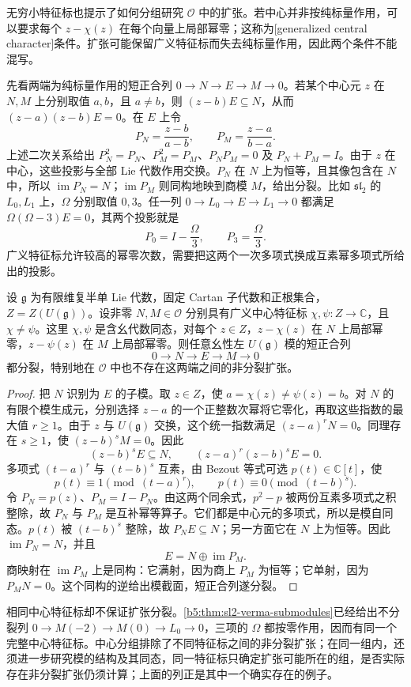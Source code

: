 无穷小特征标也提示了如何分组研究 \(\mathcal O\) 中的扩张。若中心并非按纯标量作用，可以要求每个 \(z-\chi(z)\) 在每个向量上局部幂零；这称为[generalized central character]条件。扩张可能保留广义特征标而失去纯标量作用，因此两个条件不能混写。

\ProseParagraphBreak

先看两端为纯标量作用的短正合列 \(0\to N\to E\to M\to0\)。若某个中心元 \(z\) 在 \(N,M\) 上分别取值 \(a,b\)，且 \(a\ne b\)，则 \((z-b)E\subseteq N\)，从而 \((z-a)(z-b)E=0\)。在 \(E\) 上令
\[
	P_N=\dfrac{z-b}{a-b},\qquad P_M=\dfrac{z-a}{b-a}.
\]
上述二次关系给出 \(P_N^2=P_N\)、\(P_M^2=P_M\)、\(P_NP_M=0\) 及 \(P_N+P_M=I\)。由于 \(z\) 在中心，这些投影与全部 Lie 代数作用交换。\(P_N\) 在 \(N\) 上为恒等，且其像包含在 \(N\) 中，所以 \(\operatorname{im}P_N=N\)；\(\operatorname{im}P_M\) 则同构地映到商模 \(M\)，给出分裂。比如 \(\mathfrak{sl}_2\) 的 \(L_0,L_1\) 上，\(\Omega\) 分别取值 \(0,3\)。任一列 \(0\to L_0\to E\to L_1\to0\) 都满足 \(\Omega(\Omega-3)E=0\)，其两个投影就是
\[
	P_0=I-\dfrac{\Omega}{3},\qquad P_3=\dfrac{\Omega}{3}.
\]
广义特征标允许较高的幂零次数，需要把这两个一次多项式换成互素幂多项式所给出的投影。

\begin{proposition}\label{b5:prop:distinct-central-character-splitting}
	设 \(\mathfrak g\) 为有限维复半单 Lie 代数，固定 Cartan 子代数和正根集合，\(Z=Z(U(\mathfrak g))\)。设非零 \(N,M\in\mathcal O\) 分别具有广义中心特征标 \(\chi,\psi:Z\to\mathbb C\)，且 \(\chi\ne\psi\)。这里 \(\chi,\psi\) 是含幺代数同态，对每个 \(z\in Z\)，\(z-\chi(z)\) 在 \(N\) 上局部幂零，\(z-\psi(z)\) 在 \(M\) 上局部幂零。则任意幺性左 \(U(\mathfrak g)\) 模的短正合列
	\[
		0\longrightarrow N\longrightarrow E\longrightarrow M\longrightarrow0
	\]
	都分裂，特别地在 \(\mathcal O\) 中也不存在这两端之间的非分裂扩张。
\end{proposition}
\begin{proof}
	把 \(N\) 识别为 \(E\) 的子模。取 \(z\in Z\)，使 \(a=\chi(z)\ne\psi(z)=b\)。对 \(N\) 的有限个模生成元，分别选择 \(z-a\) 的一个正整数次幂将它零化，再取这些指数的最大值 \(r\ge1\)。由于 \(z\) 与 \(U(\mathfrak g)\) 交换，这个统一指数满足 \((z-a)^rN=0\)。同理存在 \(s\ge1\)，使 \((z-b)^sM=0\)。因此
	\[
		(z-b)^sE\subseteq N,\qquad (z-a)^r(z-b)^sE=0.
	\]
	多项式 \((t-a)^r\) 与 \((t-b)^s\) 互素，由 Bezout 等式可选 \(p(t)\in\mathbb C[t]\)，使
	\[
		p(t)\equiv1\pmod{(t-a)^r},\qquad p(t)\equiv0\pmod{(t-b)^s}.
	\]
	令 \(P_N=p(z)\)、\(P_M=I-P_N\)。由这两个同余式，\(p^2-p\) 被两份互素多项式之积整除，故 \(P_N\) 与 \(P_M\) 是互补幂等算子。它们都是中心元的多项式，所以是模自同态。\(p(t)\) 被 \((t-b)^s\) 整除，故 \(P_NE\subseteq N\)；另一方面它在 \(N\) 上为恒等。因此 \(\operatorname{im}P_N=N\)，并且
	\[
		E=N\oplus\operatorname{im}P_M.
	\]
	商映射在 \(\operatorname{im}P_M\) 上是同构：它满射，因为商上 \(P_M\) 为恒等；它单射，因为 \(P_MN=0\)。这个同构的逆给出模截面，短正合列遂分裂。
\end{proof}

相同中心特征标却不保证扩张分裂。\cref{b5:thm:sl2-verma-submodules}已经给出不分裂列 \(0\to M(-2)\to M(0)\to L_0\to0\)，三项的 \(\Omega\) 都按零作用，因而有同一个完整中心特征标。中心分组排除了不同特征标之间的非分裂扩张；在同一组内，还须进一步研究模的结构及其同态，同一特征标只确定扩张可能所在的组，是否实际存在非分裂扩张仍须计算；上面的列正是其中一个确实存在的例子。

